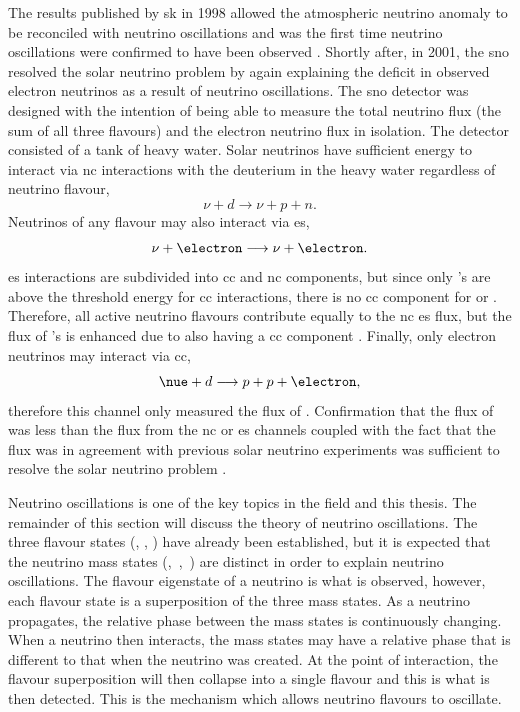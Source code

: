 The results published by \gls{sk} in 1998 allowed the atmospheric neutrino anomaly to be reconciled with neutrino oscillations and was the first time neutrino oscillations were confirmed to have been observed \cite{SuperK_neutrino_oscillations}. Shortly after, in 2001, the \Gls{sno} resolved the solar neutrino problem by again explaining the deficit in observed electron neutrinos as a result of neutrino oscillations. The \gls{sno} detector was designed with the intention of being able to measure the total neutrino flux (the sum of all three flavours) and the electron neutrino flux in isolation. The detector consisted of a tank of heavy water. Solar neutrinos have sufficient energy to interact via \gls{nc} interactions with the deuterium in the heavy water regardless of neutrino flavour,
\begin{equation}
    \nu + d \longrightarrow \nu + p + n.
\end{equation}
Neutrinos of any flavour may also interact via \gls{es},
\begin{equation}
    \nu + \electron \longrightarrow \nu + \electron.
\end{equation}
\gls{es} interactions are subdivided into \gls{cc} and \gls{nc} components, but since only \nue's are above the threshold energy for \gls{cc} interactions, there is no \gls{cc} component for \numu or \nutau. Therefore, all active neutrino flavours contribute equally to the \gls{nc} \gls{es} flux, but the flux of \nue's is enhanced due to also having a \gls{cc} component \cite{SNO_ES}. Finally, only electron neutrinos may interact via \gls{cc},
\begin{equation}
    \nue + d \longrightarrow p + p + \electron,
\end{equation}
therefore this channel only measured the flux of \nue. Confirmation that the flux of \nue was less than the flux from the \gls{nc} or \gls{es} channels coupled with the fact that the \nue flux was in agreement with previous solar neutrino experiments was sufficient to resolve the solar neutrino problem \cite{SNO_solar_neutrinos}.

Neutrino oscillations is one of the key topics in the field and this thesis. The remainder of this section will discuss the theory of neutrino oscillations. The three flavour states (\nue, \numu, \nutau) have already been established,
but it is expected that the neutrino mass states \mbox{(\nuone, \nutwo, \nuthree)} are distinct in order to explain neutrino oscillations. The flavour eigenstate of a neutrino is what is observed, however, each flavour state is a superposition of the three mass states. As a neutrino propagates, the relative phase between the mass states is continuously changing. When a neutrino then interacts, the mass states may have a relative phase that is different to that when the neutrino was created. At the point of interaction, the flavour superposition will then collapse into a single flavour and this is what is then detected. This is the mechanism which allows neutrino flavours to oscillate. 

